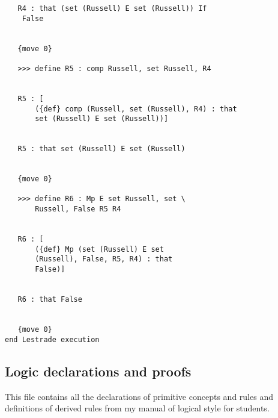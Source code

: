 \begin{verbatim}
   R4 : that (set (Russell) E set (Russell)) If 
    False


   {move 0}

   >>> define R5 : comp Russell, set Russell, R4


   R5 : [
       ({def} comp (Russell, set (Russell), R4) : that 
       set (Russell) E set (Russell))]


   R5 : that set (Russell) E set (Russell)


   {move 0}

   >>> define R6 : Mp E set Russell, set \
       Russell, False R5 R4


   R6 : [
       ({def} Mp (set (Russell) E set 
       (Russell), False, R5, R4) : that 
       False)]


   R6 : that False


   {move 0}
end Lestrade execution
\end{verbatim}

\subsection{Logic declarations and proofs}

This file contains all the declarations of primitive concepts and rules and definitions of derived rules from my manual of logical style for students.

